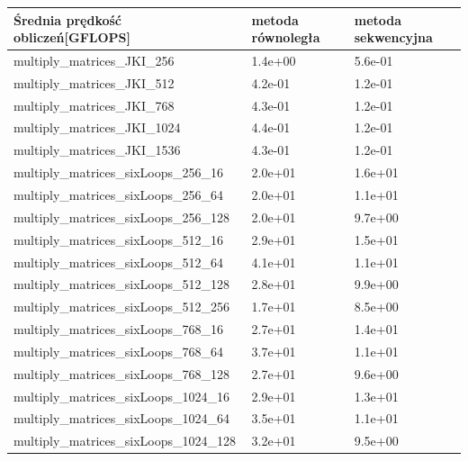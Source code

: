 \documentclass{scrartcl}
\begin{document}
\begin{table}[H]
\begin{tabular}{|l|l|l|}
\hline
Średnia prędkość obliczeń{[}GFLOPS{]} & metoda równoległa & metoda sekwencyjna \\ \hline
multiply\_matrices\_JKI\_256          & 1.4e+00           & 5.6e-01            \\ \hline
multiply\_matrices\_JKI\_512          & 4.2e-01           & 1.2e-01            \\ \hline
multiply\_matrices\_JKI\_768          & 4.3e-01           & 1.2e-01            \\ \hline
multiply\_matrices\_JKI\_1024         & 4.4e-01           & 1.2e-01            \\ \hline
multiply\_matrices\_JKI\_1536         & 4.3e-01           & 1.2e-01            \\ \hline
multiply\_matrices\_sixLoops\_256\_16   & 2.0e+01           & 1.6e+01            \\ \hline
multiply\_matrices\_sixLoops\_256\_64   & 2.0e+01           & 1.1e+01            \\ \hline
multiply\_matrices\_sixLoops\_256\_128  & 2.0e+01           & 9.7e+00            \\ \hline
multiply\_matrices\_sixLoops\_512\_16   & 2.9e+01           & 1.5e+01            \\ \hline
multiply\_matrices\_sixLoops\_512\_64   & 4.1e+01           & 1.1e+01            \\ \hline
multiply\_matrices\_sixLoops\_512\_128  & 2.8e+01           & 9.9e+00            \\ \hline
multiply\_matrices\_sixLoops\_512\_256  & 1.7e+01           & 8.5e+00            \\ \hline
multiply\_matrices\_sixLoops\_768\_16   & 2.7e+01           & 1.4e+01            \\ \hline
multiply\_matrices\_sixLoops\_768\_64   & 3.7e+01           & 1.1e+01            \\ \hline
multiply\_matrices\_sixLoops\_768\_128  & 2.7e+01           & 9.6e+00            \\ \hline
multiply\_matrices\_sixLoops\_1024\_16  & 2.9e+01           & 1.3e+01            \\ \hline
multiply\_matrices\_sixLoops\_1024\_64  & 3.5e+01           & 1.1e+01            \\ \hline
multiply\_matrices\_sixLoops\_1024\_128 & 3.2e+01           & 9.5e+00            \\ \hline

\end{tabular}
\end{table}
\end{document}

